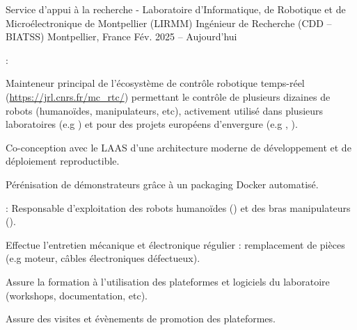 
\begin{cventries}
  \cventry
  {Service d'appui à la recherche - Laboratoire d'Informatique, de Robotique et de Microélectronique de Montpellier (LIRMM)} %
  {Ingénieur de Recherche (CDD -- BIATSS)} %
  {Montpellier, France} %
  {Fév. 2025 -- Aujourd'hui} %
  {
    \begin{cvitems} %
    \item {} :
      \begin{subitems}
      \item Mainteneur principal de l'écosystème de contrôle robotique temps-réel 
        (\url{https://jrl.cnrs.fr/mc_rtc/}) permettant
        le contrôle de plusieurs dizaines de robots (humanoïdes, manipulateurs, etc), activement utilisé dans
        plusieurs laboratoires (e.g ) et pour des projets européens d'envergure
        (e.g , ).
      \item Co-conception avec le LAAS d'une architecture moderne de développement et de déploiement
        reproductible.
      \item Pérénisation de démonstrateurs grâce à un packaging Docker automatisé.
      \end{subitems}
    \item {}: Responsable d'exploitation des robots humanoïdes () et des bras manipulateurs ().
      \begin{subitems}
      \item Effectue l'entretien mécanique et électronique régulier : remplacement de pièces (e.g moteur,
        câbles électroniques défectueux).
      \item Assure la formation à l'utilisation des plateformes et logiciels du laboratoire (workshops,
        documentation, etc).
      \item Assure des visites et évènements de promotion des plateformes.

\end{subitems}
\end{cvitems}}
\end{cventries}
